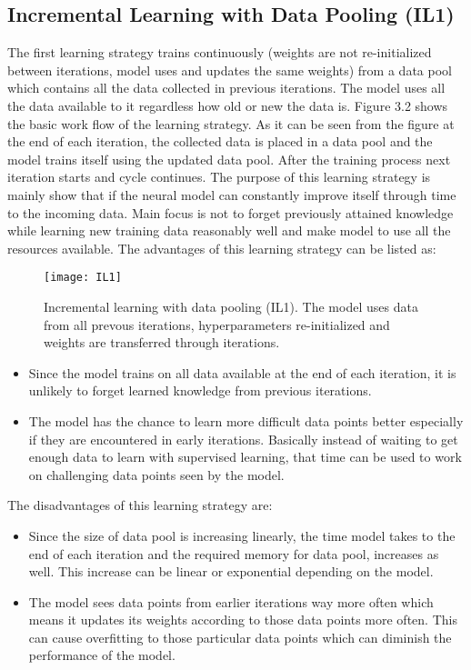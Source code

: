 \subsection{Incremental Learning with Data Pooling (IL1)}

The first learning strategy trains continuously (weights are not re-initialized between iterations, model uses and updates the same weights) from a data pool which contains all the data collected in previous iterations. The model uses all the data available to it regardless how old or new the data is. Figure 3.2 shows the basic work flow of the learning strategy. As it can be seen from the figure at the end of each iteration, the collected data is placed in a data pool and the model trains itself using the updated data pool. After the training process next iteration starts and cycle continues. The purpose of this learning strategy is mainly show that if the neural model can constantly improve itself through time to the incoming data. Main focus is not to forget previously attained knowledge while learning new training data reasonably well and make model to use all the resources available. The advantages of this learning strategy can be listed as:

\begin{figure}[t]
\texttt{[image: IL1]}
\centering
\caption{Incremental learning with data pooling (IL1). The model uses data from all prevous iterations, hyperparameters re-initialized and weights are transferred through iterations.}
\end{figure}

\begin{itemize}

  \item Since the model trains on all data available at the end of each iteration, it is unlikely to forget learned knowledge from previous iterations.
  \item The model has the chance to learn more difficult data points better especially if they are encountered in early iterations. Basically instead of waiting to get enough data to learn with supervised learning, that time can be used to work on challenging data points seen by the model.

\end{itemize}

The disadvantages of this learning strategy are:

\begin{itemize}

  \item Since the size of data pool is increasing linearly, the time model takes to the end of each iteration and the required memory for data pool, increases as well. This increase can be linear or exponential depending on the model.
  \item The model sees data points from earlier iterations way more often which means it updates its weights according to those data points more often. This can cause overfitting to those particular data points which can diminish the performance of the model.

\end{itemize}

